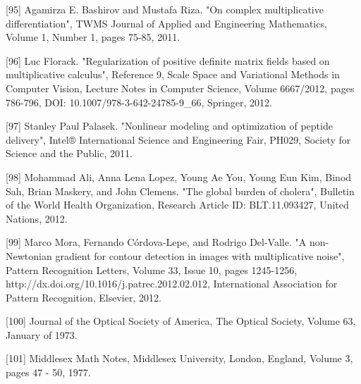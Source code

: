 \documentclass[12pt]{article}
\begin{document}
[95] Agamirza E. Bashirov and Mustafa Riza. "On complex multiplicative differentiation", TWMS Journal of Applied and Engineering Mathematics, Volume 1, Number 1, pages 75-85, 2011.

[96] Luc Florack. "Regularization of positive definite matrix fields based on multiplicative calculus", Reference 9, Scale Space and Variational Methods in Computer Vision, Lecture Notes in Computer Science, Volume 6667/2012, pages 786-796, DOI: 10.1007/978-3-642-24785-9_66, Springer, 2012.

[97] Stanley Paul Palasek. "Nonlinear modeling and optimization of peptide delivery", Intel® International Science and Engineering Fair, PH029, Society for Science and the Public, 2011.

[98] Mohammad Ali, Anna Lena Lopez, Young Ae You, Young Eun Kim, Binod Sah, Brian Maskery, and John Clemens. "The global burden of cholera", Bulletin of the World Health Organization, Research Article ID: BLT.11.093427, United Nations, 2012.

[99] Marco Mora, Fernando Córdova-Lepe, and Rodrigo Del-Valle. "A non-Newtonian gradient for contour detection in images with multiplicative noise", Pattern Recognition Letters, Volume 33, Issue 10, pages 1245-1256, http://dx.doi.org/10.1016/j.patrec.2012.02.012, International Association for Pattern Recognition, Elsevier, 2012. 

[100] Journal of the Optical Society of America, The Optical Society, Volume 63, January of 1973.

[101] Middlesex Math Notes, Middlesex University, London, England, Volume 3, pages 47 - 50, 1977.
\end{document}
